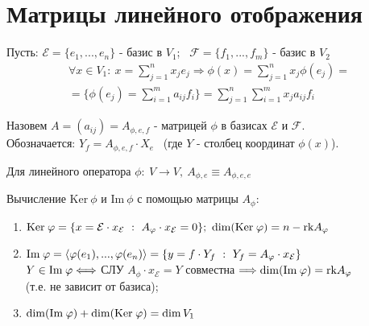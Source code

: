 \section{Матрицы линейного отображения}
    Пусть: $\mathcal{E} = \{e_1,...,e_n\}$ - базис в $V_1$; \ $\mathcal{F} = \{f_1,...,f_m\}$ - базис в $V_2$
    \begin{multline*}
        \forall x \in V_1 : \ x = \sum \limits_{j=1}^n x_je_j \Longrightarrow \phi(x) = \sum \limits_{j=1}^n x_j \phi(e_j)= \\ 
        = \{\phi(e_j) = \sum \limits_{i=1}^m a_{ij}f_i\} = \sum \limits_{j=1}^n \sum \limits_{i=1}^m x_ja_{ij}f_i
    \end{multline*}
    \begin{definition}
        Назовем $A = (a_{ij}) = A_{\phi,e,f}$ - матрицей $\phi$ в базисах $\mathcal{E}$ и $\mathcal{F}$.\\ 
        Обозначается: $Y_f = A_{\phi,e,f} \cdot X_e$ \ (где $Y$ - столбец координат $\phi(x)$).    
    \end{definition} 
    \begin{remark}
        Для линейного оператора $\phi: \ V \to V, \ A_{\phi,e}\equiv A_{\phi,e,e}$ 
    \end{remark}
    \begin{algorithm} 
        Вычисление $\text{Ker}\ \phi$ и $\text{Im}\ \phi$ с помощью матрицы $A_\phi :$
        \begin{enumerate}
            \item $\text{Ker} \hspace{0.09cm} \phi = \{x = \mathcal{E} \cdot x_\mathcal{E} \ : \ A_\phi \cdot x_\mathcal{E} = 0\}; \ \dim (\text{Ker} \hspace{0.09cm} \phi) = n - \text{rk} A_\phi$
            \item $\text{Im} \hspace{0.09cm} \phi = \langle \phi(e_1),...,\phi(e_n) \rangle = \{y = f \cdot Y_f \ : \ Y_f = A_\phi \cdot x_\mathcal{E}\}$ \\
            $Y \in \text{Im} \hspace{0.09cm} \phi \Longleftrightarrow $ СЛУ $A_\phi \cdot x_\mathcal{E} = Y$ совместна $\Longrightarrow \dim (\text{Im} \hspace{0.09cm} \phi) = \text{rk} A_\phi$ \\ (т.е. не зависит от базиса);
            \item $\dim (\text{Im}\hspace{0.09cm} \phi) + \dim (\text{Ker}\hspace{0.09cm} \phi) = \dim V_1$   
        \end{enumerate}
    \end{algorithm}
